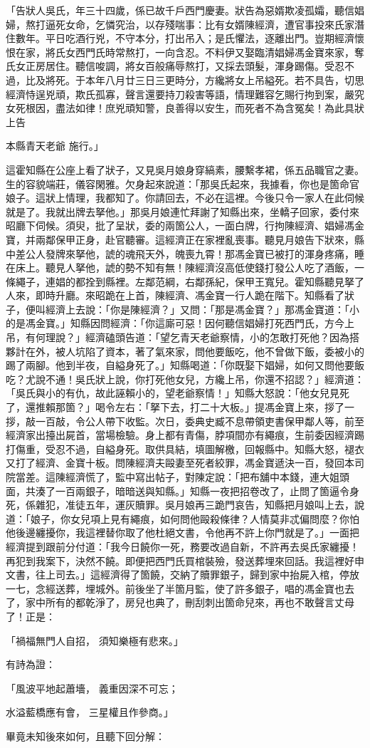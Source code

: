 「告狀人吳氏，年三十四歲，係已故千戶西門慶妻。狀告為惡婿欺凌孤孀，聽信娼婦，熬打逼死女命，乞憐究治，以存殘喘事：比有女婿陳經濟，遭官事投來氏家潛住數年。平日吃酒行兇，不守本分，打出吊入；是氏懼法，逐離出門。豈期經濟懷恨在家，將氏女西門氏時常熬打，一向含忍。不料伊又娶臨清娼婦馮金寶來家，奪氏女正房居住。聽信唆調，將女百般痛辱熬打，又採去頭髮，渾身踢傷。受忍不過，比及將死。于本年八月廿三日三更時分，方纔將女上吊縊死。若不具告，切思經濟恃逞兇頑，欺氏孤寡，聲言還要持刀殺害等語，情理難容乞賜行拘到案，嚴究女死根因，盡法如律！庶兇頑知警，良善得以安生，而死者不為含冤矣！為此具狀上告

本縣青天老爺    施行。」

這霍知縣在公座上看了狀子，又見吳月娘身穿縞素，腰繫孝裙，係五品職官之妻。生的容貌端莊，儀容閑雅。欠身起來說道：「那吳氏起來，我據看，你也是箇命官娘子。這狀上情理，我都知了。你請回去，不必在這裡。今後只令一家人在此伺候就是了。我就出牌去拏他。」那吳月娘連忙拜謝了知縣出來，坐轎子回家，委付來昭廳下伺候。須臾，批了呈狀，委的兩箇公人，一面白牌，行拘陳經濟、娼婦馮金寶，并兩鄰保甲正身，赴官聽審。這經濟正在家裡亂喪事。聽見月娘告下狀來，縣中差公人發牌來拏他，諕的魂飛天外，魄喪九霄！那馮金寶已被打的渾身疼痛，睡在床上。聽見人拏他，諕的勢不知有無！陳經濟沒高低使錢打發公人吃了酒飯，一條繩子，連娼的都拴到縣裡。左鄰范綱，右鄰孫紀，保甲王寬兒。霍知縣聽見拏了人來，即時升廳。來昭跪在上首，陳經濟、馮金寶一行人跪在階下。知縣看了狀子，便叫經濟上去說：「你是陳經濟？」又問：「那是馮金寶？」那馮金寶道：「小的是馮金寶。」知縣因問經濟：「你這廝可惡！因何聽信娼婦打死西門氏，方今上吊，有何理說？」經濟磕頭告道：「望乞青天老爺察情，小的怎敢打死他？因為搭夥計在外，被人坑陷了資本，著了氣來家，問他要飯吃，他不曾做下飯，委被小的踢了兩腳。他到半夜，自縊身死了。」知縣喝道：「你既娶下娼婦，如何又問他要飯吃？尤說不通！吳氏狀上說，你打死他女兒，方纔上吊，你還不招認？」經濟道：「吳氏與小的有仇，故此誣賴小的，望老爺察情！」知縣大怒說：「他女兒見死了，還推賴那箇？」喝令左右：「拏下去，打二十大板。」提馮金寶上來，拶了一拶，敲一百敲，令公人帶下收監。次日，委典史臧不息帶領吏書保甲鄰人等，前至經濟家出擡出屍首，當場檢驗。身上都有青傷，脖項間亦有繩痕，生前委因經濟踢打傷重，受忍不過，自縊身死。取供具結，填圖解檄，回報縣中。知縣大怒，褪衣又打了經濟、金寶十板。問陳經濟夫毆妻至死者絞罪，馮金寶遞決一百，發回本司院當差。這陳經濟慌了，監中寫出帖子，對陳定說：「把布舖中本錢，連大姐頭面，共湊了一百兩銀子，暗暗送與知縣。」知縣一夜把招卷改了，止問了箇逼令身死，係雜犯，准徒五年，運灰贖罪。吳月娘再三跪門哀告，知縣把月娘叫上去，說道：「娘子，你女兒項上見有繩痕，如何問他毆殺條律？人情莫非忒偏問麼？你怕他後邊纏擾你，我這裡替你取了他杜絕文書，令他再不許上你門就是了。」一面把經濟提到跟前分付道：「我今日饒你一死，務要改過自新，不許再去吳氏家纏擾！再犯到我案下，決然不饒。即便把西門氏買棺裝殮，發送葬埋來回話。我這裡好申文書，往上司去。」這經濟得了箇饒，交納了贖罪銀子，歸到家中抬屍入棺，停放一七，念經送葬，埋城外。前後坐了半箇月監，使了許多銀子，唱的馮金寶也去了，家中所有的都乾淨了，房兒也典了，刪刮刺出箇命兒來，再也不敢聲言丈母了！正是：

「禍福無門人自招，  須知樂極有悲來。」

有詩為證：

「風波平地起蕭墻，  義重因深不可忘；

水溢藍橋應有會，  三星權且作參商。」

畢竟未知後來如何，且聽下回分解：

